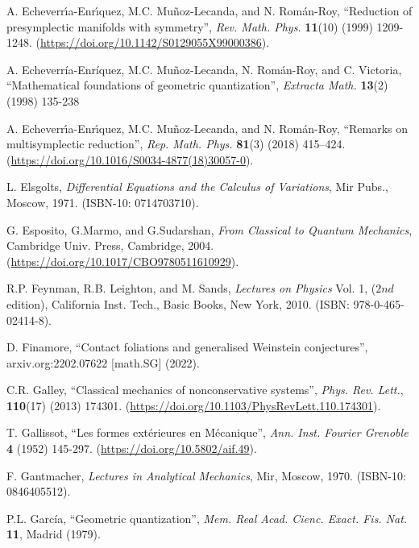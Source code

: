 \documentclass[12pt]{report}
\begin{document}
\begin{thebibliography}{999}
A. Echeverr\'\i a-Enr\'\i quez, M.C. Mu\~noz-Lecanda, and N. Rom\'an-Roy,
``Reduction of presymplectic manifolds with symmetry'',
{\sl Rev. Math. Phys.} {\bf 11}(10) (1999) 1209-1248.
(\url{https://doi.org/10.1142/S0129055X99000386}).


A. Echeverr\'ia-Enr\'iquez, M.C. Mu\~noz-Lecanda, N. Rom\'an-Roy, and C. Victoria,
``Mathematical foundations of geometric quantization'',
{\sl Extracta Math.} {\bf 13}(2) (1998) 135-238

A. Echeverr\'\i a-Enr\'\i quez, M.C. Mu\~noz-Lecanda, and N. Rom\'an-Roy,
``Remarks on multisymplectic reduction'',
{\sl Rep. Math. Phys.} {\bf 81}(3) (2018) 415--424.
(\url{https://doi.org/10.1016/S0034-4877(18)30057-0}).

L. Elsgolts, 
{\it Differential Equations and the Calculus of Variations}, 
Mir Pubs., Moscow, 1971.
(ISBN-10: 0714703710).

G. Esposito, G.Marmo, and G.Sudarshan,
\emph{From Classical to Quantum Mechanics},
Cambridge Univ. Press, Cambridge, 2004.
(\url{https://doi.org/10.1017/CBO9780511610929}).

R.P. Feynman, R.B. Leighton, and M. Sands, {\it Lectures on Physics} Vol. 1,
 ($2nd$ edition), California Inst. Tech.,
 Basic Books, New York, 2010.
 (ISBN: 978-0-465-02414-8).

D. Finamore,
``Contact foliations and generalised Weinstein conjectures'', 
arxiv.org:2202.07622 [math.SG] (2022).

C.R. Galley,
``Classical mechanics of nonconservative systems'',
{\sl Phys. Rev. Lett.}, {\bf 110}(17)
(2013) 174301.
(\url{https://doi.org/10.1103/PhysRevLett.110.174301}).

T. Gallissot,
``Les formes ext\'erieures en M\'ecanique'',
{\sl Ann. Inst. Fourier Grenoble} {\bf 4} (1952) 145-297.
(\url{https://doi.org/10.5802/aif.49}).

F. Gantmacher,
{\it Lectures in Analytical Mechanics},
Mir, Moscow, 1970.
(ISBN-10: 0846405512).

{P.L. Garc\'ia},
``Geometric quantization'',
{\sl Mem. Real Acad. Cienc. Exact. Fis. Nat.} {\bf 11}, Madrid (1979).


\end{thebibliography}
\end{document}
